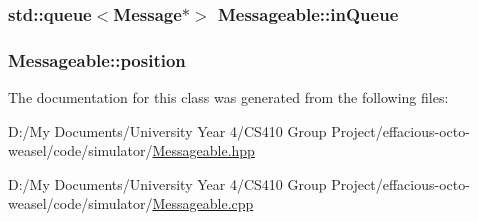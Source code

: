 \subsubsection[{\texorpdfstring{in\+Queue}{inQueue}}]{\setlength{\rightskip}{0pt plus 5cm}std\+::queue$<${\bf Message}$\ast$$>$ Messageable\+::in\+Queue\hspace{0.3cm}{\ttfamily [protected]}}\hypertarget{class_messageable_a77bee602af65ca6708c3d77080298376}{}\label{class_messageable_a77bee602af65ca6708c3d77080298376}
\subsubsection[{\texorpdfstring{position}{position}}]{ Messageable\+::position\hspace{0.3cm}{\ttfamily [protected]}}\hypertarget{class_messageable_a49ee36421becbc9f529f3d63d5e3169a}{}\label{class_messageable_a49ee36421becbc9f529f3d63d5e3169a}


The documentation for this class was generated from the following files\+:\begin{DoxyCompactItemize}
\item 
D\+:/\+My Documents/\+University Year 4/\+C\+S410 Group Project/effacious-\/octo-\/weasel/code/simulator/\hyperlink{_messageable_8hpp}{Messageable.\+hpp}\item 
D\+:/\+My Documents/\+University Year 4/\+C\+S410 Group Project/effacious-\/octo-\/weasel/code/simulator/\hyperlink{_messageable_8cpp}{Messageable.\+cpp}\end{DoxyCompactItemize}
